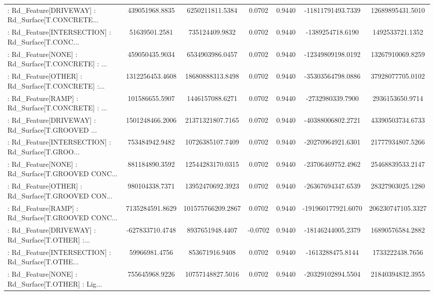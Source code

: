 \begin{longtable}{p{4cm}cccccc}
 : Rd\_Feature[DRIVEWAY] : Rd\_Surface[T.CONCRETE... &    439051968.8835 &   6250211811.5384 &  0.0702 &       0.9440 &  -11811791493.7339 &  12689895431.5010 \\
 : Rd\_Feature[INTERSECTION] : Rd\_Surface[T.CONC... &     51639501.2581 &    735124409.9832 &  0.0702 &       0.9440 &   -1389254718.6190 &   1492533721.1352 \\
 : Rd\_Feature[NONE] : Rd\_Surface[T.CONCRETE] : ... &    459050435.9034 &   6534903986.0457 &  0.0702 &       0.9440 &  -12349809198.0192 &  13267910069.8259 \\
 : Rd\_Feature[OTHER] : Rd\_Surface[T.CONCRETE] :... &   1312256453.4608 &  18680888313.8498 &  0.0702 &       0.9440 &  -35303564798.0886 &  37928077705.0102 \\
 : Rd\_Feature[RAMP] : Rd\_Surface[T.CONCRETE] : ... &    101586655.5907 &   1446157088.6271 &  0.0702 &       0.9440 &   -2732980339.7900 &   2936153650.9714 \\
 : Rd\_Feature[DRIVEWAY] : Rd\_Surface[T.GROOVED ... &   1501248466.2006 &  21371321807.7165 &  0.0702 &       0.9440 &  -40388006802.2721 &  43390503734.6733 \\
 : Rd\_Feature[INTERSECTION] : Rd\_Surface[T.GROO... &    753484942.9482 &  10726385107.7409 &  0.0702 &       0.9440 &  -20270964921.6301 &  21777934807.5266 \\
 : Rd\_Feature[NONE] : Rd\_Surface[T.GROOVED CONC... &    881184890.3592 &  12544283170.0315 &  0.0702 &       0.9440 &  -23706469752.4962 &  25468839533.2147 \\
 : Rd\_Feature[OTHER] : Rd\_Surface[T.GROOVED CON... &    980104338.7371 &  13952470692.3923 &  0.0702 &       0.9440 &  -26367694347.6539 &  28327903025.1280 \\
 : Rd\_Feature[RAMP] : Rd\_Surface[T.GROOVED CONC... &   7135284591.8629 & 101575766209.2867 &  0.0702 &       0.9440 & -191960177921.6070 & 206230747105.3327 \\
 : Rd\_Feature[DRIVEWAY] : Rd\_Surface[T.OTHER] :... &   -627833710.4748 &   8937651948.4407 & -0.0702 &       0.9440 &  -18146244005.2379 &  16890576584.2882 \\
 : Rd\_Feature[INTERSECTION] : Rd\_Surface[T.OTHE... &     59966981.4756 &    853671916.9408 &  0.0702 &       0.9440 &   -1613288475.8144 &   1733222438.7656 \\
 : Rd\_Feature[NONE] : Rd\_Surface[T.OTHER] : Lig... &    755645968.9226 &  10757148827.5016 &  0.0702 &       0.9440 &  -20329102894.5504 &  21840394832.3955 \\

\end{longtable}
